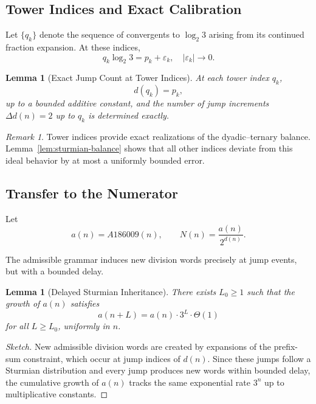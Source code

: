 \documentclass[12pt, oneside]{article}
\numberwithin{equation}{section}
\theoremstyle{definition}
\theoremstyle{plain}
\newtheorem{lemma}[theorem]{Lemma}
\theoremstyle{remark}
\newtheorem*{remark}{Remark}
\begin{document}
\subsection{Tower Indices and Exact Calibration}
\label{sec:tower-indices}

Let $\{q_k\}$ denote the sequence of convergents to $\log_2 3$ arising from
its continued fraction expansion. At these indices,
\[
q_k \log_2 3 = p_k + \varepsilon_k,
\quad |\varepsilon_k| \to 0.
\]

\begin{lemma}[Exact Jump Count at Tower Indices]
\label{lem:tower-exact}
At each tower index $q_k$,
\[
d(q_k) = p_k,
\]
up to a bounded additive constant, and the number of jump increments
$\Delta d(n)=2$ up to $q_k$ is determined exactly.
\end{lemma}

\begin{remark}
Tower indices provide exact realizations of the dyadic–ternary balance.
Lemma~\ref{lem:sturmian-balance} shows that all other indices deviate from
this ideal behavior by at most a uniformly bounded error.
\end{remark}

\subsection{Transfer to the Numerator}
\label{sec:numerator-transfer}

Let
\[
a(n) = A186009(n),
\qquad
N(n) = \frac{a(n)}{2^{d(n)}}.
\]

The admissible grammar induces new division words precisely at jump events,
but with a bounded delay.

\begin{lemma}[Delayed Sturmian Inheritance]
\label{lem:delay-inheritance}
There exists $L_0 \ge 1$ such that the growth of $a(n)$ satisfies
\[
a(n+L) = a(n)\cdot 3^L \cdot \Theta(1)
\]
for all $L \ge L_0$, uniformly in $n$.
\end{lemma}

\begin{proof}[Sketch]
New admissible division words are created by expansions of the prefix-sum
constraint, which occur at jump indices of $d(n)$. Since these jumps follow
a Sturmian distribution and every jump produces new words within bounded
delay, the cumulative growth of $a(n)$ tracks the same exponential rate
$3^n$ up to multiplicative constants.
\end{proof}
\end{document}
